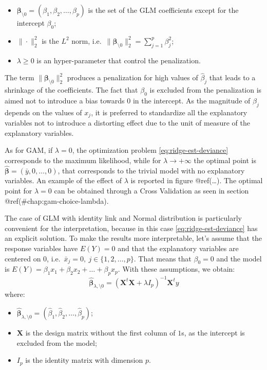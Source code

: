 \documentclass[a4paper, nobind]{templates/ociamthesis}
\providecommand{\tightlist}{%
  \setlength{\itemsep}{0pt}\setlength{\parskip}{0pt}}
\theoremstyle{definition}
\theoremstyle{definition}
\theoremstyle{definition}
\theoremstyle{remark}
\begin{document}
\begin{itemize}
\tightlist
\item
  \(\boldsymbol{\beta}_{\setminus0} = \left(\beta_1, \beta_2, \dots, \beta_p\right)\) is the set of the GLM coefficients except for the intercept \(\beta_0\);
\item
  \(\|\cdot\|_2^2\) is the \(L^2\) norm, i.e.~\(\|\boldsymbol{\beta}_{\setminus0}\|_2^2 = \sum_{j=1}^p{\beta_j^2}\);
\item
  \(\lambda\ge0\) is an hyper-parameter that control the penalization.
\end{itemize}

The term \(\|\boldsymbol{\beta}_{\setminus0}\|_2^2\) produces a penalization for high values of \(\hat{\beta}_j\) that leads to a shrinkage of the coefficients. The fact that \(\beta_0\) is excluded from the penalization is aimed not to introduce a bias towards \(0\) in the intercept. As the magnitude of \(\beta_j\) depends on the values of \(x_j\), it is preferred to standardize all the explanatory variables not to introduce a distorting effect due to the unit of measure of the explanatory variables.

As for GAM, if \(\lambda=0\), the optimization problem \eqref{eq:ridge-est-deviance} corresponds to the maximum likelihood, while for \(\lambda\to+\infty\) the optimal point is \(\hat{\boldsymbol{\beta}} = \left(\bar{y}, 0, \dots, 0\right)\), that corresponds to the trivial model with no explanatory variables. An example of the effect of \(\lambda\) is reported in figure @ref(\ldots). The optimal point for \(\lambda=0\) can be obtained through a Cross Validation as seen in section @ref(\#chap:gam-choice-lambda).

The case of GLM with identity link and Normal distribution is particularly convenient for the interpretation, because in this case \eqref{eq:ridge-est-deviance} has an explicit solution. To make the results more interpretable, let's assume that the response variables have \(E(Y)=0\) and that the explanatory variables are centered on \(0\), i.e.~\(\bar{x}_j=0, \ j\in\{1,2,\dots,p\}\). That means that \(\beta_0=0\) and the model is \(E(Y)=\beta_1x_1+\beta_2x_2+\dots+\beta_px_p\). With these assumptions, we obtain:
\begin{equation}
\label{eq:ridge-estimator}
\hat{\boldsymbol{\beta}}_{\lambda,\setminus0} = \left(\boldsymbol{X}^t\boldsymbol{X}+\lambda I_p\right)^{-1}\boldsymbol{X}^t y
\end{equation}
where:

\begin{itemize}
\tightlist
\item
  \(\hat{\boldsymbol{\beta}}_{\lambda,\setminus0} = \left(\hat{\beta}_1, \hat{\beta}_2, \dots, \hat{\beta}_p\right)\);
\item
  \(\boldsymbol{X}\) is the design matrix without the first column of \(1\)s, as the intercept is excluded from the model;
\item
  \(I_p\) is the identity matrix with dimension \(p\).
\end{itemize}
\end{document}
